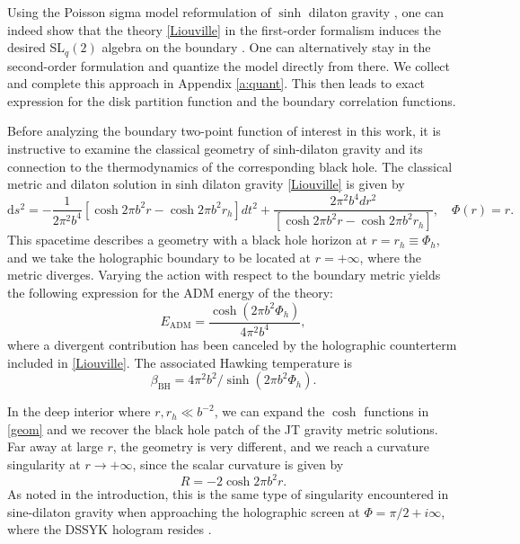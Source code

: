 \documentclass[a4paper,titlepage,12pt]{article}
\numberwithin{equation}{section}
\begin{document}
Using the Poisson sigma model reformulation of $\sinh$ dilaton gravity \cite{Fan:2021bwt}, one can indeed show that the theory \eqref{Liouville} in the first-order formalism induces the desired SL$_q(2)$ algebra on the boundary \cite{Blommaert:2023wad}. One can alternatively stay in the second-order formulation and quantize the model directly from there. We collect and complete this approach in Appendix \ref{a:quant}. This then leads to exact expression for the disk partition function and the boundary correlation functions.

Before analyzing the boundary two-point function of interest in this work, it is instructive to examine the classical geometry of sinh-dilaton gravity and its connection to the thermodynamics of the corresponding black hole. The classical metric and dilaton solution in sinh dilaton gravity \eqref{Liouville} is given by
\begin{equation}
\label{geom}
\mathrm{d} s^2 = - \frac{1}{2\pi^2b^4} \left[\cosh 2\pi b^2 r - \cosh 2 \pi b^2 r_h \right] dt^2 + \frac{2\pi^2b^4 dr^2}{ \left[\cosh  2\pi b^2 r - \cosh 2\pi b^2 r_h \right]}, \quad \Phi(r) = r.
\end{equation}
This spacetime describes a geometry with a black hole horizon at $r = r_h \equiv \Phi_h$, and we take the holographic boundary to be located at $r = +\infty$, where the metric diverges. Varying the action with respect to the boundary metric yields the following expression for the ADM energy of the theory:
\begin{equation}
\label{adm}
E_{\mathrm{ADM}} = \frac{\cosh (2\pi b^2 \Phi_h)}{4\pi^2 b^4},
\end{equation}
where a divergent contribution has been canceled by the holographic counterterm included in \eqref{Liouville}. The associated Hawking temperature is 
\begin{equation}
\label{temperature}
\beta_{\mathrm{BH}}=4\pi^2b^2 /\sinh(2\pi b^2 \Phi_h).
\end{equation}

In the deep interior where $r,r_h \ll b^{-2}$, we can expand the $\cosh$ functions in \eqref{geom} and we recover the black hole patch of the JT gravity metric solutions.
Far away at large $r$, the geometry is very different, and we reach a curvature singularity at $r\to +\infty$, since the scalar curvature is given by
\begin{equation}\label{R}
R = - 2\cosh 2\pi b^2 r.
\end{equation}
As noted in the introduction, this is the same type of singularity encountered in sine-dilaton gravity when approaching the holographic screen at $\Phi = \pi/2 + i\infty$, where the DSSYK hologram resides \cite{Blommaert:2024ymv,Blommaert:2024whf}.
\end{document}
